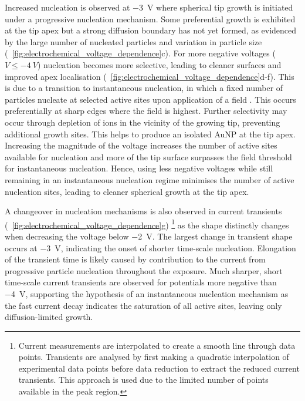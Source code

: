 \documentclass{article}
\begin{document}
Increased nucleation is observed at \SI{-3}{V} where spherical tip growth is initiated under a progressive nucleation mechanism. Some preferential growth is exhibited at the tip apex but a strong diffusion boundary has not yet formed, as evidenced by the large number of nucleated particles and variation in particle size (\figurename~\ref{fig:electrochemical_voltage_dependence}c). For more negative voltages ($V \leq \SI{-4}{V}$) nucleation becomes more selective, leading to cleaner surfaces and improved apex localisation (\figurename~\ref{fig:electrochemical_voltage_dependence}d-f). This is due to a transition to instantaneous nucleation, in which a fixed number of particles nucleate at selected active sites upon application of a field \cite{hyde2003}. This occurs preferentially at sharp edges where the field is highest. Further selectivity may occur through depletion of ions in the vicinity of the growing tip, preventing additional growth sites. This helps to produce an isolated AuNP at the tip apex. Increasing the magnitude of the voltage increases the number of active sites available for nucleation and more of the tip surface surpasses the field threshold for instantaneous nucleation. Hence, using less negative voltages while still remaining in an instantaneous nucleation regime minimises the number of active nucleation sites, leading to cleaner spherical growth at the tip apex.

A changeover in nucleation mechanisms is also observed in current transients (\figurename~\ref{fig:electrochemical_voltage_dependence}g)%
\footnote{Current measurements are interpolated to create a smooth line through data points. Transients are analysed by first making a quadratic interpolation of experimental data points before data reduction to extract the reduced current transients. This approach is used due to the limited number of points available in the peak region.}
as the shape distinctly changes when decreasing the voltage below \SI{-2}{V}. The largest change in transient shape occurs at \SI{-3}{V}, indicating the onset of shorter time-scale nucleation. Elongation of the transient time is likely caused by contribution to the current from progressive particle nucleation throughout the exposure. Much sharper, short time-scale current transients are observed for potentials more negative than \SI{-4}{V}, supporting the hypothesis of an instantaneous nucleation mechanism as the fast current decay indicates the saturation of all active sites, leaving only diffusion-limited growth.
\end{document}
